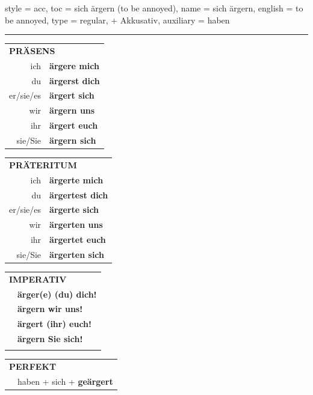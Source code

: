 \begin{verbentry}{
  style = {acc},
  toc = {sich ärgern (to be annoyed)},
  name = {sich ärgern},
  english = {to be annoyed},
  type = {regular, + Akkusativ},
  auxiliary = {haben}
}
 
    
       \vspace{5pt}

    \hrule
    
    \vspace{5pt}

  \begin{tabular}{rl}
     \multicolumn{2}{l}{\textbf{PRÄSENS} }\\
    ich & \textbf{ärgere mich}\\
    du & \textbf{ärgerst dich}\\
    er/sie/es & \textbf{ärgert sich}\\
    wir & \textbf{ärgern uns}\\
    ihr & \textbf{ärgert euch}\\
    sie/Sie & \textbf{ärgern sich}\\
  \end{tabular}
  \hfill
     \begin{tabular}{rl}
    \multicolumn{2}{l}{\textbf{PRÄTERITUM} }\\
    ich & \textbf{ärgerte mich}\\
    du & \textbf{ärgertest dich}\\
    er/sie/es & \textbf{ärgerte sich}\\
    wir & \textbf{ärgerten uns}\\
    ihr & \textbf{ärgertet euch}\\
    sie/Sie & \textbf{ärgerten sich}\\
  \end{tabular}
  \hfill
  \begin{tabular}{rl}
     \multicolumn{2}{l}{\textbf{IMPERATIV} }\\
   & \textbf{ärger(e) (du) dich!}\\
   & \textbf{ärgern wir uns!}\\
   & \textbf{ärgert (ihr) euch!}\\
   & \textbf{ärgern Sie sich!}\\
   & \vspace{10pt}
  \end{tabular}

    \vspace{10pt}

 \begin{tabular}{rl}
     \multicolumn{2}{l}{\textbf{PERFEKT}}\\
    &haben + sich + \textbf{geärgert}\\
  \end{tabular}
\hfill
   \begin{tabular}{rl}
   

\end{tabular}
\end{verbentry}
